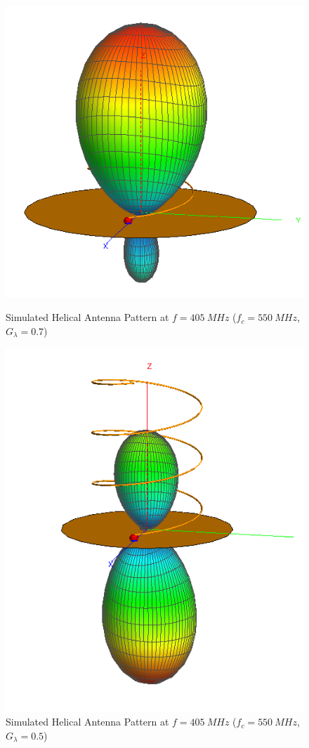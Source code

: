 \begin{figure}[!htb]
  \begin{minipage}{.48\textwidth}
    \centering
    \includegraphics[width=0.75\linewidth]{helix3_pattern_405MHz}
    \caption{Simulated Helical \mbox{Antenna} Pattern at $f = \SI{405}{MHz}$ ($f_c = \SI{550}{MHz}$, $G_\lambda = 0.7$)}
    \label{fig:helix3_pattern_405MHz}
  \end{minipage}
  \begin{minipage}{.48\textwidth}
    \centering
    \includegraphics[width=0.6\linewidth]{helix2_pattern_405MHz}
    \caption{Simulated Helical \mbox{Antenna} Pattern at $f = \SI{405}{MHz}$ ($f_c = \SI{550}{MHz}$, $G_\lambda = 0.5$)}
    \label{fig:helix2_pattern_405MHz}
  \end{minipage}
\end{figure}

